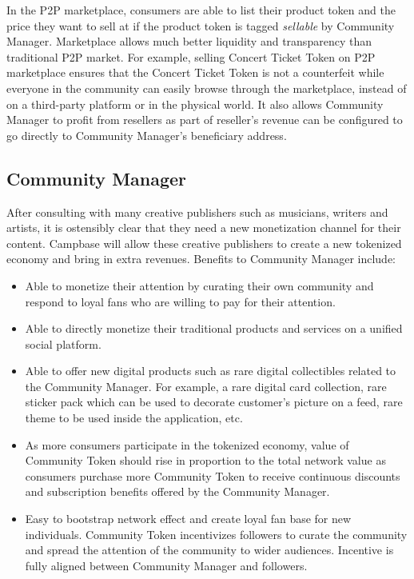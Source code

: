 \documentclass[letterpaper,11pt]{article}
\begin{document}
In the P2P marketplace, consumers are able to list their product token and the price they want to sell at if the product token is tagged \textit{sellable} by Community Manager. Marketplace allows much better liquidity and transparency than traditional P2P market. For example, selling Concert Ticket Token on P2P marketplace ensures that the Concert Ticket Token is not a counterfeit while everyone in the community can easily browse through the marketplace, instead of on a third-party platform or in the physical world. It also allows Community Manager to profit from resellers as part of reseller's revenue can be configured to go directly to Community Manager’s beneficiary address.

\subsection{Community Manager}
After consulting with many creative publishers such as musicians, writers and artists, it is ostensibly clear that they need a new monetization channel for their content. Campbase will allow these creative publishers to create a new tokenized economy and bring in extra revenues.
\newline
\newline
Benefits to Community Manager include:
\begin{itemize}
\item Able to monetize their attention by curating their own community and respond to loyal fans who are willing to pay for their attention.
\item Able to directly monetize their traditional products and services on a unified social platform.
\item Able to offer new digital products such as rare digital collectibles related to the Community Manager. For example, a rare digital card collection, rare sticker pack which can be used to decorate customer’s picture on a feed, rare theme to be used inside the application, etc.
\item As more consumers participate in the tokenized economy, value of Community Token should rise in proportion to the total network value as consumers purchase more Community Token to receive continuous discounts and subscription benefits offered by the Community Manager.
\item Easy to bootstrap network effect and create loyal fan base for new individuals. Community Token incentivizes followers to curate the community and spread the attention of the community to wider audiences. Incentive is fully aligned between Community Manager and followers.
\end{itemize}
\end{document}
